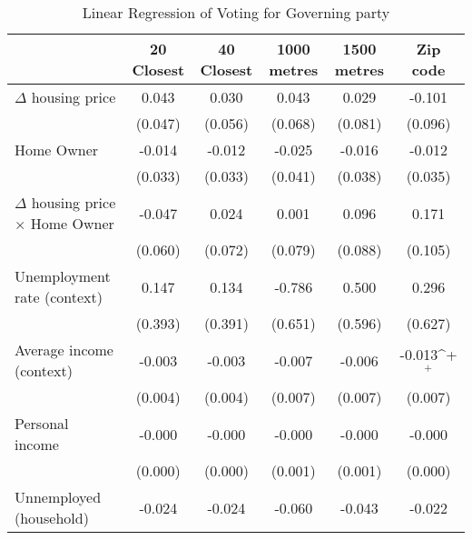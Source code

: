 \begin{table}[htbp]\centering
\def\sym#1{\ifmmode^{#1}\else\(^{#1}\)\fi}
\caption{Linear Regression of Voting for Governing party } \footnotesize \label{home}
\begin{tabular}{l*{5}{c}}
\hline\hline
                    &\multicolumn{1}{c}{20 Closest}&\multicolumn{1}{c}{40 Closest}&\multicolumn{1}{c}{1000 metres}&\multicolumn{1}{c}{1500 metres}&\multicolumn{1}{c}{Zip code}\\
\hline
$\Delta$ housing price&       0.043       &       0.030       &       0.043       &       0.029       &      -0.101       \\
                    &     (0.047)       &     (0.056)       &     (0.068)       &     (0.081)       &     (0.096)       \\
[1em]
Home Owner          &      -0.014       &      -0.012       &      -0.025       &      -0.016       &      -0.012       \\
                    &     (0.033)       &     (0.033)       &     (0.041)       &     (0.038)       &     (0.035)       \\
[1em]
$\Delta$ housing price $\times$ Home Owner&      -0.047       &       0.024       &       0.001       &       0.096       &       0.171       \\
                    &     (0.060)       &     (0.072)       &     (0.079)       &     (0.088)       &     (0.105)       \\
[1em]
Unemployment rate (context)&       0.147       &       0.134       &      -0.786       &       0.500       &       0.296       \\
                    &     (0.393)       &     (0.391)       &     (0.651)       &     (0.596)       &     (0.627)       \\
[1em]
Average income (context)&      -0.003       &      -0.003       &      -0.007       &      -0.006       &      -0.013\sym{+}\\
                    &     (0.004)       &     (0.004)       &     (0.007)       &     (0.007)       &     (0.007)       \\
[1em]
Personal income     &      -0.000       &      -0.000       &      -0.000       &      -0.000       &      -0.000       \\
                    &     (0.000)       &     (0.000)       &     (0.001)       &     (0.001)       &     (0.000)       \\
[1em]
Unnemployed (household)&      -0.024       &      -0.024       &      -0.060       &      -0.043       &      -0.022       \\

\end{tabular}
\end{table}
